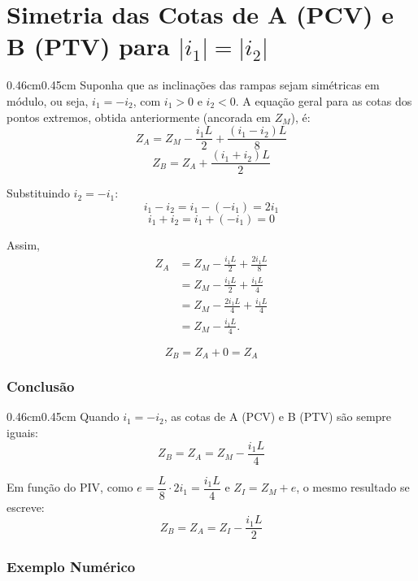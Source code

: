 \documentclass[12pt,letterpaper]{article}
\newenvironment{corpo}{\begin{adjustwidth}{0.46cm}{0.45cm}\justifying}{\end{adjustwidth}}
\begin{document}
\section*{Simetria das Cotas de A (PCV) e B (PTV) para $|i_1|=|i_2|$}

\begin{corpo}
Suponha que as inclinações das rampas sejam simétricas em módulo, ou seja, $i_1=-i_2$, com $i_1>0$ e $i_2<0$. A equação geral para as cotas dos pontos extremos, obtida anteriormente (ancorada em $Z_M$), é:
\[
 Z_A=Z_M-\frac{i_1L}{2}+\frac{(i_1-i_2)L}{8}
\]
\[
 Z_B=Z_A+\frac{(i_1+i_2)L}{2}
\]

Substituindo $i_2=-i_1$:
\[
 i_1-i_2=i_1-(-i_1)=2i_1
\]
\[
 i_1+i_2=i_1+(-i_1)=0
\]

Assim,
\[
\begin{aligned}
Z_A
&=Z_M-\frac{i_1L}{2}+\frac{2i_1L}{8} \\
&=Z_M-\frac{i_1L}{2}+\frac{i_1L}{4} \\
&=Z_M-\frac{2i_1L}{4}+\frac{i_1L}{4} \\
&=Z_M-\frac{i_1L}{4}.
\end{aligned}
\]

\[
 Z_B=Z_A+0=Z_A
\]
\end{corpo}

\subsubsection*{Conclusão}

\begin{corpo}
Quando $i_1=-i_2$, as cotas de A (PCV) e B (PTV) são sempre iguais:
\[
 Z_B=Z_A=Z_M-\frac{i_1L}{4}
\]

Em função do PIV, como $e=\dfrac{L}{8}\cdot 2i_1=\dfrac{i_1L}{4}$ e $Z_I=Z_M+e$, o mesmo resultado se escreve:
\[
 Z_B=Z_A=Z_I-\frac{i_1L}{2}
\]
\end{corpo}

\subsubsection*{Exemplo Numérico}
\end{document}

